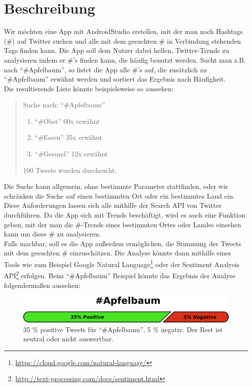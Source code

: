 \documentclass{scrartcl}
\begin{document}
\section*{Beschreibung}
Wir möchten eine App mit AndroidStudio erstellen, mit der man nach Hashtags (\#) auf Twitter suchen und alle mit dem gesuchten \# in Verbindung stehenden Tags finden kann. Die App soll dem Nutzer dabei helfen, Twitter-Trends zu analysieren indem er \#'s finden kann, die häufig benutzt werden. 
Sucht man z.B. nach \enquote{\#Apfelbaum}, so listet die App alle \#'s auf, die zusätzlich zu \enquote{\#Apfelbaum} erwähnt werden und sortiert das Ergebnis nach Häufigkeit. \\
Die resultierende Liste könnte beispielsweise so aussehen:
\begin{quotation}
Suche nach: \enquote{\#Apfelbaum}
\begin{enumerate}
\item \enquote{\#Obst} 60x erwähnt
\item \enquote{\#Essen} 35x erwähnt
\item \enquote{\#Gesund} 12x erwähnt
\end{enumerate}
100 Tweets wurden durchsucht.
\end{quotation}
Die Suche kann allgemein, ohne bestimmte Parameter stattfinden, oder wir schränken die Suche auf einen bestimmten Ort oder ein bestimmtes Land ein. Diese Anforderungen lassen sich alle mithilfe der Search API von Twitter durchführen. Da die App sich mit Trends beschäftigt, wird es auch eine Funktion geben, mit der man die \#-Trends eines bestimmten Ortes oder Landes einsehen kann um diese \# zu analysieren.\\
Falls machbar, soll es die App außerdem ermöglichen, die Stimmung der Tweets mit dem gesuchten \# einzuschätzen. Die Analyse könnte dann mithilfe eines Tools wie zum Beispiel Google Natural Language\footnote{\url{https://cloud.google.com/natural-language/}} oder der Sentiment Analysis API\footnote{\url{http://text-processing.com/docs/sentiment.html}} erfolgen. Beim \enquote{\#Apfelbaum} Beispiel könnte das Ergebnis der Analyse folgendermaßen aussehen:
\begin{figure}[h]
\centering
\includegraphics[width=.5\textwidth]{sentimentVisualize.png}
\caption*{35 \% positive Tweets für \enquote{\#Apfelbaum}, 5 \% negativ. Der Rest ist neutral oder nicht auswertbar.}
\end{figure}

\newpage

\newpage

\end{document}

